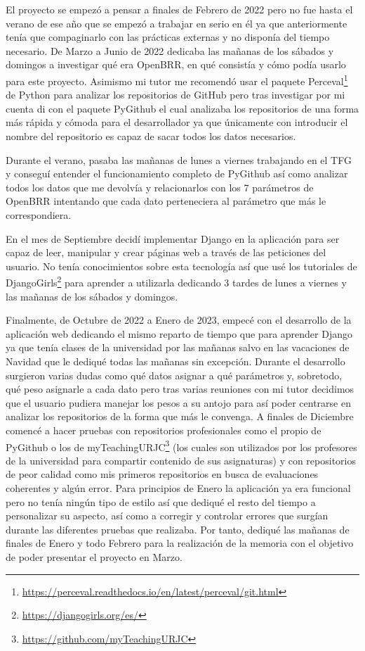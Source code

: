\documentclass[a4paper, 12pt]{book}
\begin{document}
El proyecto se empezó a pensar a finales de Febrero de 2022 pero no fue hasta el verano de ese año que se empezó a trabajar en serio en él ya que anteriormente tenía que compaginarlo con las prácticas externas y no disponía del tiempo necesario. 
De Marzo a Junio de 2022 dedicaba las mañanas de los sábados y domingos a investigar qué era OpenBRR, en qué consistía y cómo podía usarlo para este proyecto. Asimismo mi tutor me recomendó usar el paquete Perceval\footnote{\url{https://perceval.readthedocs.io/en/latest/perceval/git.html}} de Python para analizar los repositorios de GitHub pero tras investigar por mi cuenta di con el paquete PyGithub el cual analizaba los repositorios de una forma más rápida y cómoda para el desarrollador ya que únicamente con introducir el nombre del repositorio es capaz de sacar todos los datos necesarios.

Durante el verano, pasaba las mañanas de lunes a viernes trabajando en el TFG y conseguí entender el funcionamiento completo de PyGithub así como analizar todos los datos que me devolvía y relacionarlos con los 7 parámetros de OpenBRR intentando que cada dato perteneciera al parámetro que más le correspondiera.

En el mes de Septiembre decidí implementar Django en la aplicación para ser capaz de leer, manipular y crear páginas web a través de las peticiones del usuario. No tenía conocimientos sobre esta tecnología así que usé los tutoriales de DjangoGirls\footnote{\url{https://djangogirls.org/es/}}\cite{website:DjangoGirls} para aprender a utilizarla dedicando 3 tardes de lunes a viernes y las mañanas de los sábados y domingos.

Finalmente, de Octubre de 2022 a Enero de 2023, empecé con el desarrollo de la aplicación web dedicando el mismo reparto de tiempo que para aprender Django ya que tenía clases de la universidad por las mañanas salvo en las vacaciones de Navidad que le dediqué todas las mañanas sin excepción. Durante el desarrollo surgieron varias dudas como qué datos asignar a qué parámetros y, sobretodo, qué peso asignarle a cada dato pero tras varias reuniones con mi tutor decidimos que el usuario pudiera manejar los pesos a su antojo para así poder centrarse en analizar los repositorios de la forma que más le convenga.
A finales de Diciembre comencé a hacer pruebas con repositorios profesionales como el propio de PyGithub o los de myTeachingURJC\footnote{\url{https://github.com/myTeachingURJC}} (los cuales son utilizados por los profesores de la universidad para compartir contenido de sus asignaturas) y con repositorios de peor calidad como mis primeros repositorios en busca de evaluaciones coherentes y algún error. Para principios de Enero la aplicación ya era funcional pero no tenía ningún tipo de estilo así que dediqué el resto del tiempo a personalizar su aspecto, así como a corregir y controlar errores que surgían durante las diferentes pruebas que realizaba.
Por tanto, dediqué las mañanas de finales de Enero y todo Febrero para la realización de la memoria con el objetivo de poder presentar el proyecto en Marzo.
\end{document}
